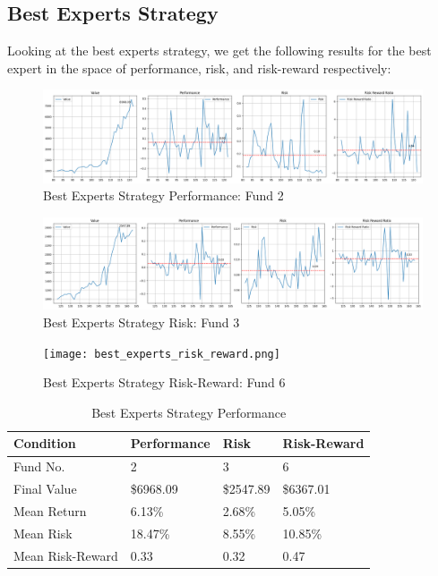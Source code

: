\documentclass{article}
\begin{document}
\subsection{Best Experts Strategy}
\label{subsec:best-experts}
Looking at the best experts strategy, we get the following results for the best expert in the space of performance, risk, and risk-reward respectively:
\begin{figure}[H]
    \centering
    \includegraphics[width=1\textwidth]{best_experts.png}
    \caption{Best Experts Strategy Performance: Fund 2}
    \label{fig:best_experts}
\end{figure}
\begin{figure}[H]
    \centering
    \includegraphics[width=1\textwidth]{best_experts_risk.png}
    \caption{Best Experts Strategy Risk: Fund 3}
    \label{fig:best_experts_risk}
\end{figure}
\begin{figure}[H]
    \centering
    \texttt{[image: best\_experts\_risk\_reward.png]}
    \caption{Best Experts Strategy Risk-Reward: Fund 6}
    \label{fig:best_experts_risk_reward}
\end{figure}
\begin{table}[H]
    \centering
    \begin{tabular}{l m{2cm} m{2cm} m{2cm}}
        \toprule
        {Condition} & {Performance} & {Risk} & {Risk-Reward} \\
        \midrule
        Fund No. & 2 & 3 & 6 \\
        Final Value & \$6968.09 & \$2547.89 & \$6367.01\\
        Mean Return & 6.13\% & 2.68\% & 5.05\%\\
        Mean Risk & 18.47\% & 8.55\% & 10.85\%\\
        Mean Risk-Reward & 0.33 & 0.32 & 0.47\\
        \bottomrule
    \end{tabular}
    \caption{Best Experts Strategy Performance}
\end{table}
\end{document}
